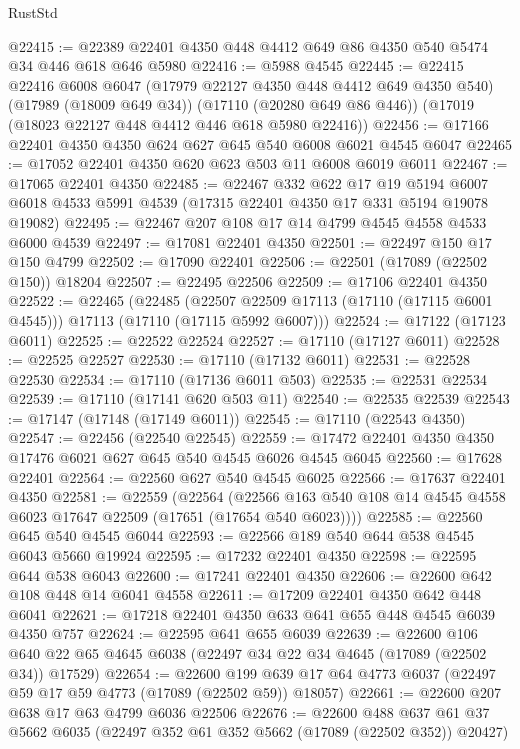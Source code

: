 \begin{lexlean}{RustStd}
\begin{coremodule}
@22415 := @22389 @22401 @4350 @448 @4412 @649 @86 @4350 @540 @5474 @34 @446 @618 @646 @5980
@22416 := @5988 @4545
@22445 := @22415
    @22416
    @6008
    @6047
    (@17979 @22127 @4350 @448 @4412 @649 @4350 @540)
    (@17989 (@18009 @649 @34))
    (@17110 (@20280 @649 @86 @446))
    (@17019 (@18023 @22127 @448 @4412 @446 @618 @5980 @22416))
@22456 := @17166 @22401 @4350 @4350 @624 @627 @645 @540 @6008 @6021 @4545 @6047
@22465 := @17052 @22401 @4350 @620 @623 @503 @11 @6008 @6019 @6011
@22467 := @17065 @22401 @4350
@22485 := @22467
    @332
    @622
    @17
    @19
    @5194
    @6007
    @6018
    @4533
    @5991
    @4539
    (@17315 @22401 @4350 @17 @331 @5194 @19078 @19082)
@22495 := @22467 @207 @108 @17 @14 @4799 @4545 @4558 @4533 @6000 @4539
@22497 := @17081 @22401 @4350
@22501 := @22497 @150 @17 @150 @4799
@22502 := @17090 @22401
@22506 := @22501 (@17089 (@22502 @150)) @18204
@22507 := @22495 @22506
@22509 := @17106 @22401 @4350
@22522 := @22465
    (@22485
      (@22507 @22509 @17113 (@17110 (@17115 @6001 @4545)))
      @17113
      (@17110 (@17115 @5992 @6007)))
@22524 := @17122 (@17123 @6011)
@22525 := @22522 @22524
@22527 := @17110 (@17127 @6011)
@22528 := @22525 @22527
@22530 := @17110 (@17132 @6011)
@22531 := @22528 @22530
@22534 := @17110 (@17136 @6011 @503)
@22535 := @22531 @22534
@22539 := @17110 (@17141 @620 @503 @11)
@22540 := @22535 @22539
@22543 := @17147 (@17148 (@17149 @6011))
@22545 := @17110 (@22543 @4350)
@22547 := @22456 (@22540 @22545)
@22559 := @17472 @22401 @4350 @4350 @17476 @6021 @627 @645 @540 @4545 @6026 @4545 @6045
@22560 := @17628 @22401
@22564 := @22560 @627 @540 @4545 @6025
@22566 := @17637 @22401 @4350
@22581 := @22559
    (@22564
      (@22566 @163 @540 @108 @14 @4545 @4558 @6023 @17647 @22509 (@17651 (@17654 @540 @6023))))
@22585 := @22560 @645 @540 @4545 @6044
@22593 := @22566 @189 @540 @644 @538 @4545 @6043 @5660 @19924
@22595 := @17232 @22401 @4350
@22598 := @22595 @644 @538 @6043
@22600 := @17241 @22401 @4350
@22606 := @22600 @642 @108 @448 @14 @6041 @4558
@22611 := @17209 @22401 @4350 @642 @448 @6041
@22621 := @17218 @22401 @4350 @633 @641 @655 @448 @4545 @6039 @4350 @757
@22624 := @22595 @641 @655 @6039
@22639 := @22600
    @106
    @640
    @22
    @65
    @4645
    @6038
    (@22497 @34 @22 @34 @4645 (@17089 (@22502 @34)) @17529)
@22654 := @22600
    @199
    @639
    @17
    @64
    @4773
    @6037
    (@22497 @59 @17 @59 @4773 (@17089 (@22502 @59)) @18057)
@22661 := @22600 @207 @638 @17 @63 @4799 @6036 @22506
@22676 := @22600
    @488
    @637
    @61
    @37
    @5662
    @6035
    (@22497 @352 @61 @352 @5662 (@17089 (@22502 @352)) @20427)

\end{coremodule}
\end{lexlean}

